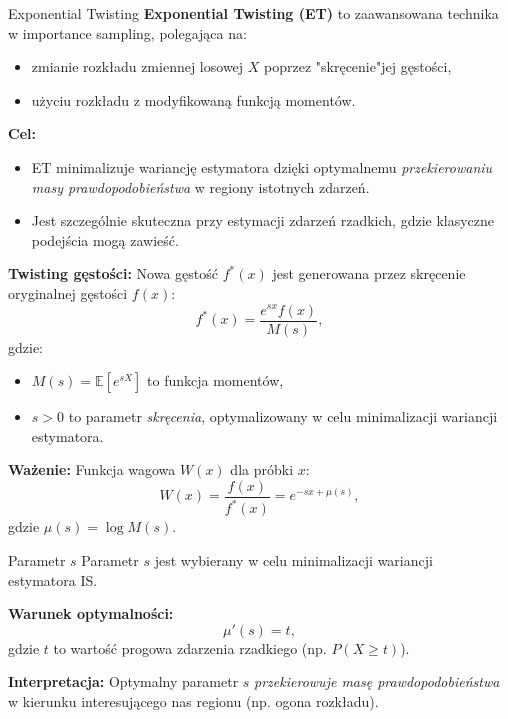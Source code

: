 \documentclass{beamer}
\begin{document}
\begin{frame}{Exponential Twisting}
    \textbf{Exponential Twisting (ET)} to zaawansowana technika w importance sampling, polegająca na:
    \begin{itemize}
        \item zmianie rozkładu zmiennej losowej $X$ poprzez "skręcenie"\space jej gęstości,
        \item użyciu rozkładu z modyfikowaną funkcją momentów.
    \end{itemize}

    \vspace{0.5cm}
    \textbf{Cel:} 
    \begin{itemize}
        \item ET minimalizuje wariancję estymatora dzięki optymalnemu \textit{przekierowaniu masy prawdopodobieństwa} w regiony istotnych zdarzeń.
        \item Jest szczególnie skuteczna przy estymacji zdarzeń rzadkich, gdzie klasyczne podejścia mogą zawieść.
    \end{itemize}
\end{frame}

\begin{frame}
    \textbf{Twisting gęstości:} Nowa gęstość $f^*(x)$ jest generowana przez skręcenie oryginalnej gęstości $f(x)$:
    \[
    f^*(x) = \frac{e^{sx} f(x)}{M(s)},
    \]
    gdzie:
    \begin{itemize}
        \item $M(s) = \mathbb{E}[e^{sX}]$ to funkcja momentów,
        \item $s > 0$ to parametr \textit{skręcenia}, optymalizowany w celu minimalizacji wariancji estymatora.
    \end{itemize}

    \vspace{0.5cm}
    \textbf{Ważenie:} Funkcja wagowa $W(x)$ dla próbki $x$:
    \[
    W(x) = \frac{f(x)}{f^*(x)} = e^{-sx + \mu(s)},
    \]
    gdzie $\mu(s) = \log M(s)$.
\end{frame}

\begin{frame}{Parametr $s$}
    Parametr $s$ jest wybierany w celu minimalizacji wariancji \\ estymatora IS. 

    \vspace{0.5cm}
    \textbf{Warunek optymalności:}
    \[
    \mu'(s) = t,
    \]
    gdzie $t$ to wartość progowa zdarzenia rzadkiego (np. $P(X \geq t)$).

    \vspace{0.5cm}
    \textbf{Interpretacja:} Optymalny parametr $s$ \textit{przekierowuje masę prawdopodobieństwa} w kierunku interesującego nas regionu (np. ogona rozkładu).
\end{frame}
\end{document}
